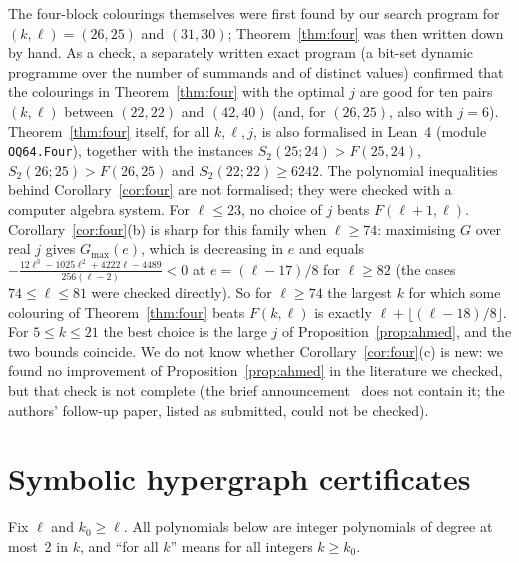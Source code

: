 \documentclass[11pt]{amsart}
\theoremstyle{definition}
\newcommand{\F}{F}
\newcommand{\Stwo}{S_2}
\begin{document}
\noindent The four-block colourings themselves were first found by our search program for $(k,\ell)=(26,25)$ and $(31,30)$; Theorem~\ref{thm:four} was then written down by hand. As a check, a separately written exact program (a bit-set dynamic programme over the number of summands and of distinct values) confirmed that the colourings in Theorem~\ref{thm:four} with the optimal $j$ are good for ten pairs $(k,\ell)$ between $(22,22)$ and $(42,40)$ (and, for $(26,25)$, also with $j=6$). Theorem~\ref{thm:four} itself, for all $k,\ell,j$, is also formalised in Lean~4 (module \texttt{OQ64.Four}), together with the instances $\Stwo(25;24)>\F(25,24)$, $\Stwo(26;25)>\F(26,25)$ and $\Stwo(22;22)\ge6242$. The polynomial inequalities behind Corollary~\ref{cor:four} are not formalised; they were checked with a computer algebra system. For $\ell\le23$, no choice of $j$ beats $\F(\ell+1,\ell)$. Corollary~\ref{cor:four}(b) is sharp for this family when $\ell\ge74$: maximising $G$ over real $j$ gives $G_{\max}(e)$, which is decreasing in $e$ and equals $-\frac{12\ell^3-1025\ell^2+4222\ell-4489}{256(\ell-2)}<0$ at $e=(\ell-17)/8$ for $\ell\ge82$ (the cases $74\le\ell\le81$ were checked directly). So for $\ell\ge74$ the largest $k$ for which some colouring of Theorem~\ref{thm:four} beats $\F(k,\ell)$ is exactly $\ell+\lfloor(\ell-18)/8\rfloor$. For $5\le k\le21$ the best choice is the large $j$ of Proposition~\ref{prop:ahmed}, and the two bounds coincide. We do not know whether Corollary~\ref{cor:four}(c) is new: we found no improvement of Proposition~\ref{prop:ahmed} in the literature we checked, but that check is not complete (the brief announcement~\cite{ABRS2} does not contain it; the authors' follow-up paper, listed as submitted, could not be checked).

\section{Symbolic hypergraph certificates}\label{sec:method}

Fix $\ell$ and $k_0\ge\ell$. All polynomials below are integer polynomials of degree at most~2 in $k$, and ``for all $k$'' means for all integers $k\ge k_0$.
\end{document}
